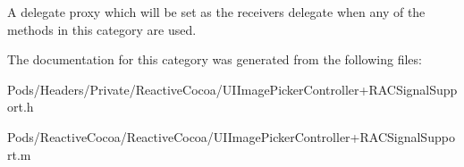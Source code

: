 A delegate proxy which will be set as the receiver\textquotesingle{}s delegate when any of the methods in this category are used. 

The documentation for this category was generated from the following files\+:\begin{DoxyCompactItemize}
\item 
Pods/\+Headers/\+Private/\+Reactive\+Cocoa/U\+I\+Image\+Picker\+Controller+\+R\+A\+C\+Signal\+Support.\+h\item 
Pods/\+Reactive\+Cocoa/\+Reactive\+Cocoa/U\+I\+Image\+Picker\+Controller+\+R\+A\+C\+Signal\+Support.\+m\end{DoxyCompactItemize}
